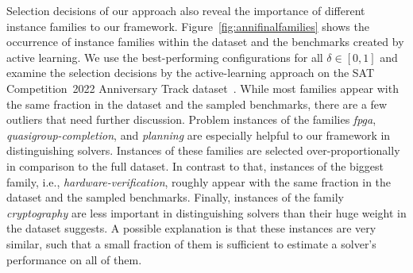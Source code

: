 \documentclass[runningheads]{llncs}
\begin{document}
Selection decisions of our approach also reveal the importance of different instance families to our framework.
Figure~\ref{fig:annifinalfamilies} shows the occurrence of instance families within the dataset and the benchmarks created by active learning.
We use the best-performing configurations for all $\delta \in \left[0, 1\right]$ and examine the selection decisions by the active-learning approach on the SAT Competition~2022 Anniversary Track dataset~\cite{sat2022}.
While most families appear with the same fraction in the dataset and the sampled benchmarks, there are a few outliers that need further discussion.
Problem instances of the families \emph{fpga}, \emph{quasigroup-completion}, and \emph{planning} are especially helpful to our framework in distinguishing solvers.
Instances of these families are selected over-proportionally in comparison to the full dataset.
In contrast to that, instances of the biggest family, i.e., \emph{hardware-verification}, roughly appear with the same fraction in the dataset and the sampled benchmarks.
Finally, instances of the family \emph{cryptography} are less important in distinguishing solvers than their huge weight in the dataset suggests.
A possible explanation is that these instances are very similar, such that a small fraction of them is sufficient to estimate a solver's performance on all of them.

\end{document}
